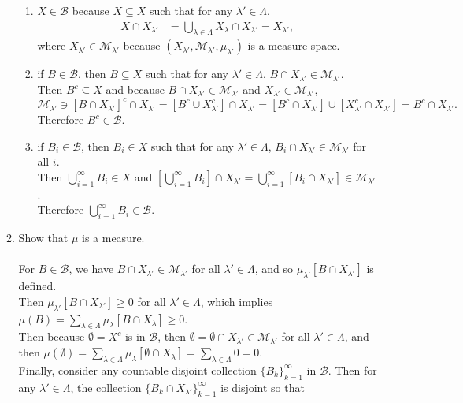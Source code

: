 \begin{enumerate}
\begin{enumerate}[label=(\roman*),align=left]
\begin{enumerate}[label=(\roman*),align=left]
			\item $X\in\mathcal{B}$ because $X\subseteq X$ such that for any $\lambda'\in\Lambda$,
			\begin{align*}
				X\cap X_{\lambda'}&= \bigcup_{\lambda\in\Lambda}X_\lambda\cap X_{\lambda'}= X_{\lambda'},
			\end{align*}
			where $X_{\lambda'}\in\mathcal{M}_{\lambda'}$ because $(X_{\lambda'},\mathcal{M}_{\lambda'},\mu_{\lambda'})$ is a measure space.
			\item if $B\in\mathcal{B}$, then $B\subseteq X$ such that for any $\lambda'\in\Lambda$, $B\cap X_{\lambda'}\in\mathcal{M}_{\lambda'}$.\\
			Then $B^c\subseteq X$ and because $ B\cap X_{\lambda'}\in\mathcal{M}_{\lambda'}$ and $X_{\lambda'}\in\mathcal{M}_{\lambda'}$,
			\[
				\mathcal{M}_{\lambda'}\ni[ B\cap X_{\lambda'}]^c\cap X_{\lambda'}=[B^c\cup X_{\lambda'}^c]\cap X_{\lambda'}=[B^c\cap X_{\lambda'}]\cup[X_{\lambda'}^c\cap X_{\lambda'}]=B^c\cap X_{\lambda'}.
			\]
			Therefore $B^c\in\mathcal{B}$.
			\item if $B_i\in\mathcal{B}$, then $B_i\in X$ such that for any $\lambda'\in\Lambda$, $B_i\cap X_{\lambda'}\in\mathcal{M}_{\lambda'}$ for all $i$.\\
			Then $\bigcup_{i=1}^\infty B_i\in X$ and $[\bigcup_{i=1}^\infty B_i]\cap X_{\lambda'} =\bigcup_{i=1}^\infty [B_i\cap X_{\lambda'}]\in\mathcal{M}_{\lambda'}$.
			\\Therefore $\bigcup_{i=1}^\infty B_i\in\mathcal{B}$.
		\end{enumerate}
		\item Show that $\mu$ is a measure.\\
		\\For $B\in\mathcal{B}$, we have $B\cap X_{\lambda'}\in\mathcal{M}_{\lambda'}$ for all $\lambda'\in\Lambda$, and so $\mu_{\lambda'}[B\cap X_{\lambda'}]$ is defined.
		\\Then $\mu_{\lambda'}[B\cap X_{\lambda'}]\ge0$ for all $\lambda'\in\Lambda$, which implies $\mu(B)=\sum_{\lambda\in\Lambda}\mu_\lambda[B\cap X_\lambda]\ge0$.
		\\Then because $\emptyset=X^c$ is in $\mathcal{B}$, then $\emptyset=\emptyset\cap X_{\lambda'}\in\mathcal{M}_{\lambda'}$ for all $\lambda'\in\Lambda$, and then $\mu(\emptyset)=\sum_{\lambda\in\Lambda}\mu_\lambda[\emptyset\cap X_\lambda]=\sum_{\lambda\in\Lambda}0=0$.
		\\Finally, consider any countable disjoint collection $\{B_k\}_{k=1}^\infty$ in $\mathcal{B}$.
		Then for any $\lambda'\in\Lambda$, the collection $\{B_k\cap X_{\lambda'}\}_{k=1}^\infty$ is disjoint so that 

\end{enumerate}
\end{enumerate}
